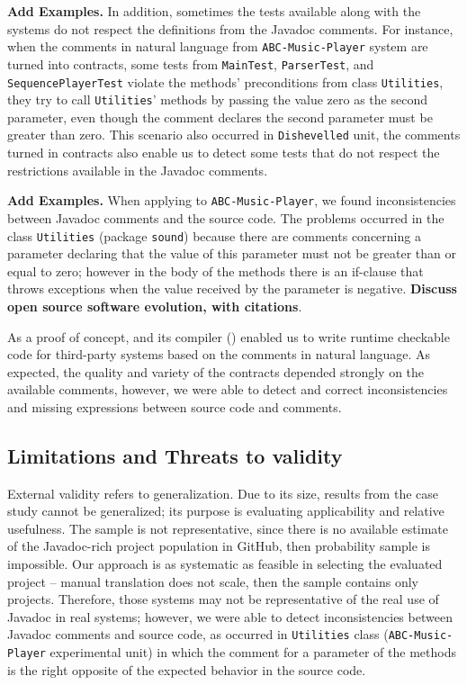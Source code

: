 \textbf{Add Examples. }
In addition, sometimes the tests available along with the systems do
not respect the definitions from the Javadoc comments. For instance, when the
comments in natural language from \texttt{ABC-Music-Player} system are turned into
\contractjdoc{} contracts, some tests from
\texttt{MainTest}, \texttt{ParserTest}, and \texttt{SequencePlayerTest} violate
the methods' preconditions from class \texttt{Utilities}, they try to
call \texttt{Utilities}' methods by passing the value zero as the second
parameter, even though the comment declares the second parameter must be greater than zero.
This scenario also occurred in \texttt{Dishevelled} unit, the comments turned
in \contractjdoc{} contracts also enable us to detect some tests
that do not respect the restrictions available in the Javadoc comments.


\textbf{Add Examples. }
When applying \contractjdoc{} to \texttt{ABC-Music-Player}, we found inconsistencies between Javadoc comments and the source code. The problems occurred in the class \texttt{Utilities} (package
\texttt{sound}) because there are comments concerning a parameter declaring that the value of
this parameter must not be greater than or equal to zero; however in the body of the methods there
is an if-clause that throws exceptions when the value received by the parameter is negative.
\textbf{Discuss open source software evolution, with citations}.

As a proof of concept, \contractjdoc{} and its compiler (\contractjdocCompiler{}) enabled us to write runtime
checkable code for third-party systems based on the comments in natural
language.
As expected, the quality and variety of the contracts depended strongly on the available comments, however, we were able to
detect and correct inconsistencies and missing expressions between source code and comments.




\subsection{Limitations and Threats to validity}
\label{sec:CaseStudyThreats}

External validity refers to generalization. Due to its size, results from the
case study cannot be generalized; its purpose is evaluating applicability and relative usefulness.
The sample is not representative, since there is no available estimate of the Javadoc-rich project
population in GitHub, then probability sample is impossible.
Our approach is as systematic as feasible in selecting the evaluated project -- manual translation
does not scale, then the sample contains only \totalSystems{} projects.
Therefore, those systems may not be representative of the real use of Javadoc in real systems; however, we were able
to detect inconsistencies between Javadoc comments and source code, as occurred in
\texttt{Utilities} class (\texttt{ABC-Music-Player} experimental unit) in which the comment for a
parameter of the methods is the right opposite of the expected behavior in the source code.



